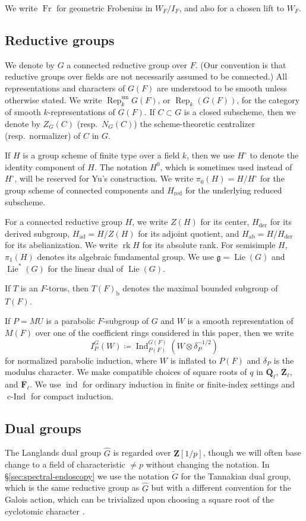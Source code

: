 \documentclass[reqno]{amsart}
\numberwithin{equation}{subsection}
\newcommand{\F}{\mathbf{F}}
\newcommand{\Q}{\mathbf{Q}}
\newcommand{\Z}{\mathbf{Z}}
\newcommand{\ol}[1]{\overline{#1}}
\newcommand{\wh}[1]{\widehat{#1}}
\newcommand\frg{\mathfrak{g}}
\DeclareMathOperator{\ab}{ab}
\DeclareMathOperator{\Ind}{Ind}
\DeclareMathOperator{\Rep}{Rep}
\DeclareMathOperator{\Lie}{Lie}
\DeclareMathOperator{\ad}{ad}
\DeclareMathOperator{\ind}{ind}
\DeclareMathOperator{\sm}{sm}
\DeclareMathOperator{\cInd}{c-Ind}
\DeclareMathOperator{\red}{red}
\DeclareMathOperator{\der}{der}
\DeclareMathOperator{\rk}{rk}
\DeclareMathOperator{\Fr}{Fr}
\newcommand{\chG}{\check{G}}
\theoremstyle{remark}
\numberwithin{equation}{subsection}
\numberwithin{figure}{subsection}
\begin{document}
We write $\Fr$ for geometric Frobenius in $W_F/I_F$, and also for a chosen lift to $W_F$.



\subsection{Reductive groups}
We denote by $G$ a connected reductive group over $F$. (Our convention is that reductive groups over fields are not necessarily assumed to be connected.) All representations and characters of $G(F)$ are understood to be smooth unless otherwise stated. We write $\Rep_k^{\sm}G(F)$, or $\Rep_k(G(F))$, for the category of smooth $k$-representations of $G(F)$. If $C \subset G$ is a closed subscheme, then we denote by $Z_G(C)$ (resp.\ $N_G(C)$) the scheme-theoretic centralizer (resp.\ normalizer) of $C$ in $G$.

If $H$ is a group scheme of finite type over a field $k$, then we use $H^\circ$ to denote the identity component of $H$. The notation $H^0$, which is sometimes used instead of $H^\circ$, will be reserved for Yu's construction. We write $\pi_0(H)=H/H^\circ$ for the group scheme of connected components and $H_{\red}$ for the underlying reduced subscheme. 


For a connected reductive group $H$, we write $Z(H)$ for its center, $H_{\der}$ for its derived subgroup, $H_{\ad}=H/Z(H)$ for its adjoint quotient, and $H_{\ab}=H/H_{\der}$ for its abelianization. We write $\rk H$ for its absolute rank. For semisimple $H$, $\pi_1(H)$ denotes its algebraic fundamental group. We use $\frg=\Lie(G)$ and $\Lie^*(G)$ for the linear dual of $\Lie(G)$.

If $T$ is an $F$-torus, then $T(F)_{\mathrm{b}}$ denotes the maximal bounded subgroup of $T(F)$.

If $P=MU$ is a parabolic $F$-subgroup of $G$ and $W$ is a smooth representation of $M(F)$ over one of the coefficient rings considered in this paper, then we write
\[
I_P^G(W)\coloneqq \Ind_{P(F)}^{G(F)}(W\otimes\delta_P^{-1/2})
\]
for normalized parabolic induction, where $W$ is inflated to $P(F)$ and $\delta_P$ is the modulus character. We make compatible choices of square roots of $q$ in $\ol\Q_\ell$, $\ol\Z_\ell$, and $\ol\F_\ell$. We use $\ind$ for ordinary induction in finite or finite-index settings and $\cInd$ for compact induction.


\subsection{Dual groups}
The Langlands dual group $\wh{G}$ is regarded over $\Z[1/p]$, though we will often base change to a field of characteristic $\neq p$ without changing the notation. In \S \ref{sec:spectral-endoscopy} we use the notation $\chG$ for the Tannakian dual group, which is the same reductive group as $\wh{G}$ but with a different convention for the Galois action, which can be trivialized upon choosing a square root of the cyclotomic character \cite[\S VI.11]{FS}.
\end{document}
